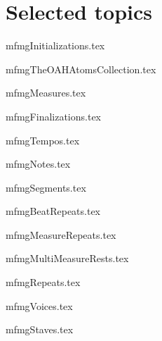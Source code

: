 



\part{Selected topics}


{mfmgInitializations.tex}



{mfmgTheOAHAtomsCollection.tex}



{mfmgMeasures.tex}

{mfmgFinalizations.tex}

{mfmgTempos.tex}

{mfmgNotes.tex}

{mfmgSegments.tex}

{mfmgBeatRepeats.tex}

{mfmgMeasureRepeats.tex}

{mfmgMultiMeasureRests.tex}

{mfmgRepeats.tex}

{mfmgVoices.tex}

{mfmgStaves.tex}

